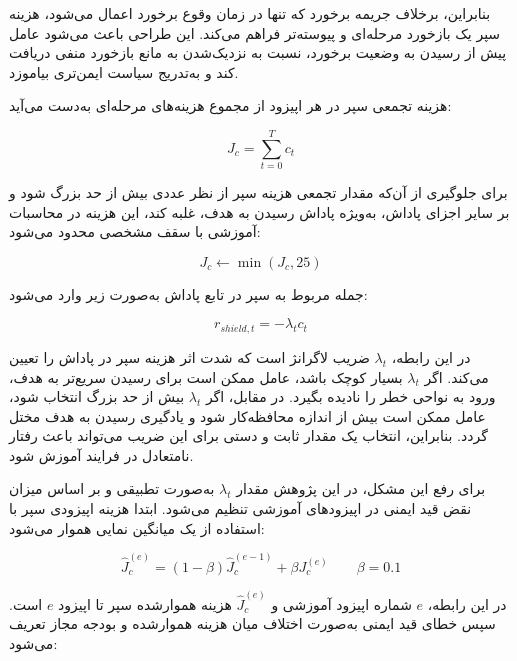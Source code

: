 بنابراین، برخلاف جریمه برخورد که تنها در زمان وقوع برخورد اعمال می‌شود، هزینه سپر یک بازخورد مرحله‌ای و پیوسته‌تر فراهم می‌کند. این طراحی باعث می‌شود عامل پیش از رسیدن به وضعیت برخورد، نسبت به نزدیک‌شدن به مانع بازخورد منفی دریافت کند و به‌تدریج سیاست ایمن‌تری بیاموزد.

هزینه تجمعی سپر در هر اپیزود از مجموع هزینه‌های مرحله‌ای به‌دست می‌آید:

\begin{equation}
	J_c =
	\sum_{t=0}^{T} c_t
	\label{eq:shield_episode_cost_final}
\end{equation}

برای جلوگیری از آن‌که مقدار تجمعی هزینه سپر از نظر عددی بیش از حد بزرگ شود و بر سایر اجزای پاداش، به‌ویژه پاداش رسیدن به هدف، غلبه کند، این هزینه در محاسبات آموزشی با سقف مشخصی محدود می‌شود:

\begin{equation}
	J_c \leftarrow \min(J_c,25)
	\label{eq:shield_cost_cap_final}
\end{equation}

جمله مربوط به سپر در تابع پاداش به‌صورت زیر وارد می‌شود:

\begin{equation}
	r_{shield,t}
	=
	-\lambda_t c_t
	\label{eq:shield_reward_term_final}
\end{equation}

در این رابطه، \(\lambda_t\) ضریب لاگرانژ است که شدت اثر هزینه سپر در پاداش را تعیین می‌کند. اگر \(\lambda_t\) بسیار کوچک باشد، عامل ممکن است برای رسیدن سریع‌تر به هدف، ورود به نواحی خطر را نادیده بگیرد. در مقابل، اگر \(\lambda_t\) بیش از حد بزرگ انتخاب شود، عامل ممکن است بیش از اندازه محافظه‌کار شود و یادگیری رسیدن به هدف مختل گردد. بنابراین، انتخاب یک مقدار ثابت و دستی برای این ضریب می‌تواند باعث رفتار نامتعادل در فرایند آموزش شود.

برای رفع این مشکل، در این پژوهش مقدار \(\lambda_t\) به‌صورت تطبیقی و بر اساس میزان نقض قید ایمنی در اپیزودهای آموزشی تنظیم می‌شود. ابتدا هزینه اپیزودی سپر با استفاده از یک میانگین نمایی هموار می‌شود:

\begin{equation}
	\hat{J}^{(e)}_c =
	(1-\beta)\hat{J}^{(e-1)}_c
	+
	\beta J^{(e)}_c
	\qquad
	\beta=0.1
	\label{eq:shield_cost_ema_final}
\end{equation}

در این رابطه، \(e\) شماره اپیزود آموزشی و \(\hat{J}^{(e)}_c\) هزینه هموارشده سپر تا اپیزود \(e\) است. سپس خطای قید ایمنی به‌صورت اختلاف میان هزینه هموارشده و بودجه مجاز تعریف می‌شود:

